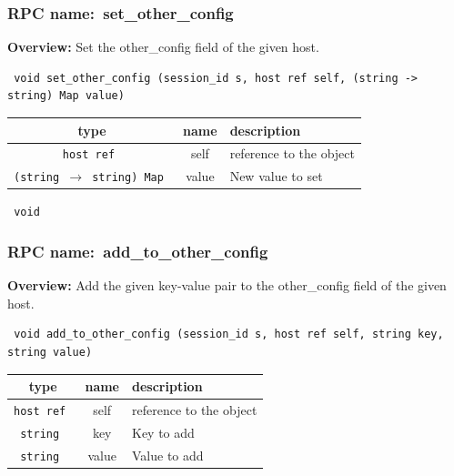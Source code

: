 \subsubsection{RPC name:~set\_other\_config}

{\bf Overview:} 
Set the other\_config field of the given host.

\begin{verbatim} void set_other_config (session_id s, host ref self, (string -> string) Map value)\end{verbatim}



 
\vspace{0.3cm}
\begin{tabular}{|c|c|p{7cm}|}
 \hline
{\bf type} & {\bf name} & {\bf description} \\ \hline
{\tt host ref } & self & reference to the object \\ \hline 

{\tt (string $\rightarrow$ string) Map } & value & New value to set \\ \hline 

\end{tabular}

\vspace{0.3cm}

{\tt 
void
}



\vspace{0.3cm}
\vspace{0.3cm}
\vspace{0.3cm}
\subsubsection{RPC name:~add\_to\_other\_config}

{\bf Overview:} 
Add the given key-value pair to the other\_config field of the given host.

\begin{verbatim} void add_to_other_config (session_id s, host ref self, string key, string value)\end{verbatim}



 
\vspace{0.3cm}
\begin{tabular}{|c|c|p{7cm}|}
 \hline
{\bf type} & {\bf name} & {\bf description} \\ \hline
{\tt host ref } & self & reference to the object \\ \hline 

{\tt string } & key & Key to add \\ \hline 

{\tt string } & value & Value to add \\ \hline 

\end{tabular}


